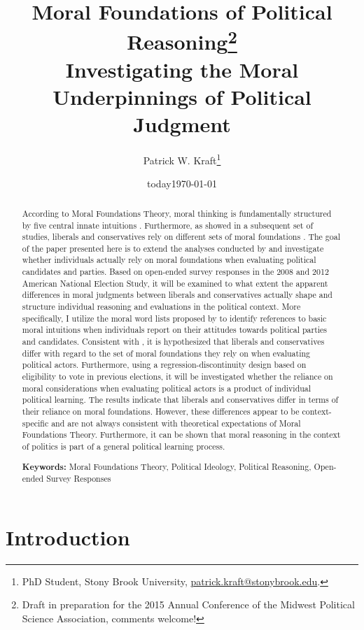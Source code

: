 \documentclass[12pt]{article}
\author{Patrick W. Kraft\footnote{PhD Student, Stony Brook University, \href{mailto:patrick.kraft@stonybrook.edu}{patrick.kraft@stonybrook.edu}.
}}
\date{today}
\title{Moral Foundations of Political Reasoning\footnote{Draft in preparation for the 2015 Annual Conference of the Midwest Political Science Association, comments welcome!}\\
\large{Investigating the Moral Underpinnings of Political Judgment}}
\date{\today}
\begin{document}
\maketitle

\begin{abstract}%
According to Moral Foundations Theory, moral thinking is fundamentally structured by five central innate intuitions \citep{haidt2008moral}. Furthermore, as \citet{graham2009liberals} showed in a subsequent set of studies, liberals and conservatives rely on different sets of moral foundations \citep[see also][]{haidt2007morality}. The goal of the paper presented here is to extend the analyses conducted by \citet{graham2009liberals} and investigate whether individuals actually rely on moral foundations when evaluating political candidates and parties. Based on open-ended survey responses in the 2008 and 2012 American National Election Study, it will be examined to what extent the apparent differences in moral judgments between liberals and conservatives actually shape and structure individual reasoning and evaluations in the political context. More specifically, I utilize the moral word lists proposed by \citet{graham2009liberals} to identify references to basic moral intuitions when individuals report on their attitudes towards political parties and candidates. Consistent with \citet{graham2009liberals}, it is hypothesized that liberals and conservatives differ with regard to the set of moral foundations they rely on when evaluating political actors. Furthermore, using a regression-discontinuity design based on eligibility to vote in previous elections, it will be investigated whether the reliance on moral considerations when evaluating political actors is a product of individual political learning. The results indicate that liberals and conservatives differ in terms of their reliance on moral foundations. However, these differences appear to be context-specific and are not always consistent with theoretical expectations of Moral Foundations Theory. Furthermore, it can be shown that moral reasoning in the context of politics is part of a general political learning process.
\vspace{\baselineskip}

\noindent \textbf{Keywords:} Moral Foundations Theory, Political Ideology, Political Reasoning, Open-ended Survey Responses
\end{abstract}

\newpage
\singlespacing

\section{Introduction}
\end{document}

